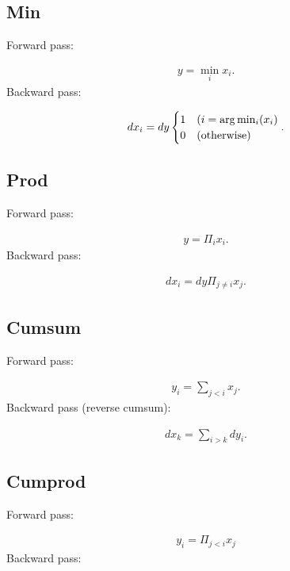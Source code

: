 \documentclass{article}
\begin{document}
\subsection{Min}

Forward pass:

\begin{eqnarray}
  y = \min_{i} x_i.    
\end{eqnarray}
%
Backward pass:

\begin{eqnarray}
  dx_i = dy \begin{cases}
     1 & (i = \arg\min_i (x_i) \\
     0 & ({\rm otherwise})
  \end{cases}. 
\end{eqnarray}


\subsection{Prod}

Forward pass:

\begin{eqnarray}
  y = \Pi_{i} x_i.    
\end{eqnarray}
%
Backward pass:

\begin{eqnarray}
  dx_i = dy \Pi_{j \neq i} x_j.
\end{eqnarray}

\subsection{Cumsum}

Forward pass:

\begin{eqnarray}
  y_i = \sum_{j < i} x_j.
\end{eqnarray}
%
Backward pass (reverse cumsum):

\begin{eqnarray}
  dx_k = \sum_{i > k} dy_i.
\end{eqnarray}

\subsection{Cumprod}

Forward pass:

\begin{eqnarray}
  y_i = \Pi_{j < i} x_j
\end{eqnarray}
%
Backward pass:
\end{document}
